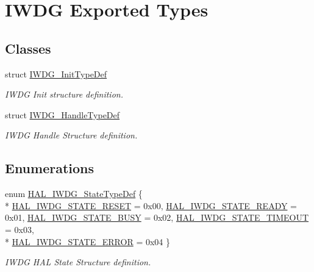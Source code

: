 \hypertarget{group___i_w_d_g___exported___types}{}\section{I\+W\+DG Exported Types}
\label{group___i_w_d_g___exported___types}
\subsection*{Classes}
\begin{DoxyCompactItemize}
\item 
struct \hyperlink{struct_i_w_d_g___init_type_def}{I\+W\+D\+G\+\_\+\+Init\+Type\+Def}
\begin{DoxyCompactList}\small\item\em I\+W\+DG Init structure definition. \end{DoxyCompactList}\item 
struct \hyperlink{struct_i_w_d_g___handle_type_def}{I\+W\+D\+G\+\_\+\+Handle\+Type\+Def}
\begin{DoxyCompactList}\small\item\em I\+W\+DG Handle Structure definition. \end{DoxyCompactList}\end{DoxyCompactItemize}
\subsection*{Enumerations}
\begin{DoxyCompactItemize}
\item 
enum \hyperlink{group___i_w_d_g___exported___types_ga61699dc6f24a3edecddd16018560d0e5}{H\+A\+L\+\_\+\+I\+W\+D\+G\+\_\+\+State\+Type\+Def} \{ \\*
\hyperlink{group___i_w_d_g___exported___types_gga61699dc6f24a3edecddd16018560d0e5afc0696c27fdaa4f7dbe7f08a9b5d6030}{H\+A\+L\+\_\+\+I\+W\+D\+G\+\_\+\+S\+T\+A\+T\+E\+\_\+\+R\+E\+S\+ET} = 0x00, 
\hyperlink{group___i_w_d_g___exported___types_gga61699dc6f24a3edecddd16018560d0e5a8aad8fa61ebdbad5411e17f7fdd35803}{H\+A\+L\+\_\+\+I\+W\+D\+G\+\_\+\+S\+T\+A\+T\+E\+\_\+\+R\+E\+A\+DY} = 0x01, 
\hyperlink{group___i_w_d_g___exported___types_gga61699dc6f24a3edecddd16018560d0e5a4ba9c9db0e319b41d19d5ad7e5b51c77}{H\+A\+L\+\_\+\+I\+W\+D\+G\+\_\+\+S\+T\+A\+T\+E\+\_\+\+B\+U\+SY} = 0x02, 
\hyperlink{group___i_w_d_g___exported___types_gga61699dc6f24a3edecddd16018560d0e5a415081e774deff4c59801adf358e2683}{H\+A\+L\+\_\+\+I\+W\+D\+G\+\_\+\+S\+T\+A\+T\+E\+\_\+\+T\+I\+M\+E\+O\+UT} = 0x03, 
\\*
\hyperlink{group___i_w_d_g___exported___types_gga61699dc6f24a3edecddd16018560d0e5a79340b932fb1f3b536fd37ebdf7b6fb6}{H\+A\+L\+\_\+\+I\+W\+D\+G\+\_\+\+S\+T\+A\+T\+E\+\_\+\+E\+R\+R\+OR} = 0x04
 \}\begin{DoxyCompactList}\small\item\em I\+W\+DG H\+AL State Structure definition. \end{DoxyCompactList}
\end{DoxyCompactItemize}



